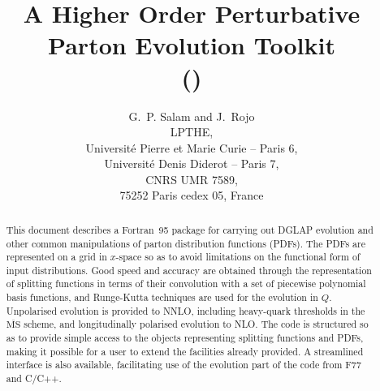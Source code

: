 \documentclass[12pt]{article}
\title{A Higher Order Perturbative Parton Evolution Toolkit \\
(\hoppet)
}
\author{G.~P. Salam and J.~Rojo\\[3pt]
  LPTHE,   \\Universit\'e Pierre et Marie Curie -- Paris 6,\\
  Universit\'e Denis Diderot -- Paris 7,\\
  CNRS UMR 7589,\\ 75252 Paris cedex 05, France}
\date{}
\newcommand{\MSbar}{\overline{\mathrm{MS}}}
\begin{document}
\maketitle 

\begin{abstract}
  This document describes a Fortran~95 package for carrying out DGLAP
  evolution and other common manipulations of parton distribution
  functions (PDFs). The PDFs are represented on a grid in $x$-space so
  as to avoid limitations on the functional form of input
  distributions.  Good speed and accuracy are obtained through the
  representation of splitting functions in terms of their convolution
  with a set of piecewise polynomial basis functions, and Runge-Kutta
  techniques are used for the evolution in $Q$.  Unpolarised evolution
  is provided to NNLO, including heavy-quark thresholds in the
  $\MSbar$ scheme, and longitudinally polarised evolution to NLO. The
  code is structured so as to provide simple access to the objects
  representing splitting functions and PDFs, making it possible for a
  user to extend the facilities already provided.
%
  A streamlined interface is also available, facilitating use of the
  evolution part of the code from F77 and C/C++.  \smallskip

\end{abstract}

\newpage


\\
\end{document}
